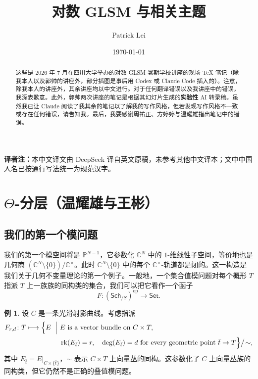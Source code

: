 \documentclass{amsart}
\title{对数 GLSM 与相关主题}
\author{Patrick Lei}
\date{\today}
\theoremstyle{definition}
\newtheorem{exm}[thm]{例}
\theoremstyle{remark}
\theoremstyle{plain}
\theoremstyle{definition}
\theoremstyle{remark}
\newcommand{\C}{\mathbb{C}}
\renewcommand{\P}{\mathbb{P}}
\newcommand{\mr}[1]{\mathrm{#1}}
\newcommand{\ms}[1]{\mathsf{#1}}
\newcommand{\1}{\mathbf{1}}
\newcommand{\2}{\mathbf{2}}
\newcommand{\3}{\mathbf{3}}
\begin{document}
    
\begin{abstract}
    这些是 2026 年 7 月在四川大学举办的对数 GLSM 暑期学校讲座的现场 \TeX{} 笔记（除我本人以及郭帅的讲座外，部分插图是事后用 Codex 或 Claude Code 插入的）。注意，除我本人的讲座外，其余讲座均以中文进行。对于任何翻译错误以及我讲座中的错误，我深表歉意。此外，郭帅两次讲座的笔记是根据其幻灯片生成的\textbf{实验性} AI 转录稿。虽然我已让 Claude 阅读了我其余的笔记以了解我的写作风格，但若发现写作风格不一致或存在任何错误，请告知我。最后，我要感谢周祐正、方婷婷与温耀雄指出笔记中的错误。
\end{abstract}

\maketitle

\tableofcontents

\bigskip
\noindent\textbf{译者注：}本中文译文由 DeepSeek 译自英文原稿，未参考其他中文译本；文中中国人名已按通行写法统一为规范汉字。

\section{\(\Theta\)-分层（温耀雄与王彬）}%
\label{sec:Theta-stratifications}

\subsection{我们的第一个模问题}%
\label{sub:Our first moduli problem}

我们的第一个模空间将是 \(\P^{N-1}\)，它参数化 \(\C^N\) 中的 \(1\)-维线性子空间，等价地也是几何商 \((\C^N \setminus \{0\}) / \C^{\times}\)。此时 \(\C^N\setminus\{0\}\) 中的每个 \(\C^{\times}\)-轨道都是闭的。这一构造是我们关于几何不变量理论的第一个例子。一般地，一个集合值模问题对每个概形 \(T\) 指派 \(T\) 上一族族的同构类的集合，我们可以把它看作一个函子
\[ F \colon (\ms{Sch}_{/S})^{\mr{op}} \to \ms{Set}. \]

\begin{exm}
    设 \(C\) 是一条光滑射影曲线。考虑指派
    \[
    \begin{aligned}
        F_{r,d}\colon T \longmapsto
        \Bigl\{
        E \ \Bigm|\ &
        E \text{ is a vector bundle on } C\times T,\\
        &\operatorname{rk}(E_{\bar t})=r,\quad \deg(E_{\bar t})=d
        \text{ for every geometric point } \bar t\to T
        \Bigr\}\big/\!\sim,
    \end{aligned}
    \]
    其中 \(E_{\bar t}=E|_{C\times\{\bar t\}}\)，\(\sim\) 表示 \(C\times T\) 上向量丛的同构。这参数化了 \(C\) 上向量丛族的同构类，但它仍然不是正确的叠值模问题。
\end{exm}
\end{document}
